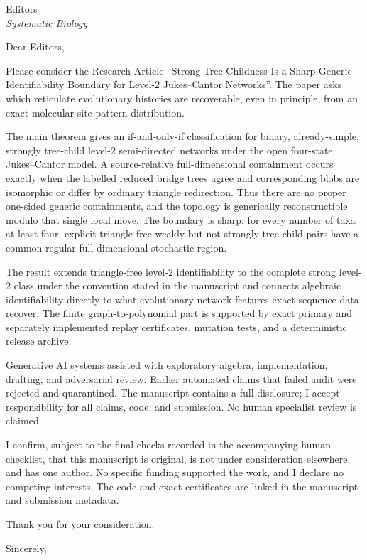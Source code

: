 \documentclass[11pt]{letter}
\date{August 2026}
\begin{document}
\begin{letter}{Editors\\\textit{Systematic Biology}}
\opening{Dear Editors,}

Please consider the Research Article ``Strong Tree-Childness Is a Sharp
Generic-Identifiability Boundary for Level-2 Jukes--Cantor Networks''.  The
paper asks which reticulate evolutionary histories are recoverable, even in
principle, from an exact molecular site-pattern distribution.

The main theorem gives an if-and-only-if classification for binary,
already-simple, strongly tree-child level-2 semi-directed networks under the
open four-state Jukes--Cantor model.  A source-relative full-dimensional
containment occurs exactly when the labelled reduced bridge trees agree and
corresponding blobs are isomorphic or differ by ordinary triangle
redirection.  Thus there are no proper one-sided generic containments, and
the topology is generically reconstructible modulo that single local move.
The boundary is sharp: for every number of taxa at least four, explicit
triangle-free weakly-but-not-strongly tree-child pairs have a common regular
full-dimensional stochastic region.

The result extends triangle-free level-2 identifiability to the complete
strong level-2 class under the convention stated in the manuscript and
connects algebraic identifiability directly to what evolutionary network
features exact sequence data recover.  The finite graph-to-polynomial part is
supported by exact primary and separately implemented replay certificates,
mutation tests, and a deterministic release archive.

Generative AI systems assisted with exploratory algebra, implementation,
drafting, and adversarial review.  Earlier automated claims that failed audit
were rejected and quarantined.  The manuscript contains a full disclosure;
I accept responsibility for all claims, code, and submission.  No human
specialist review is claimed.

I confirm, subject to the final checks recorded in the accompanying human
checklist, that this manuscript is original, is not under consideration
elsewhere, and has one author.  No specific funding supported the work, and I
declare no competing interests.  The code and exact certificates are linked
in the manuscript and submission metadata.

Thank you for your consideration.

\closing{Sincerely,}
\end{letter}
\end{document}
